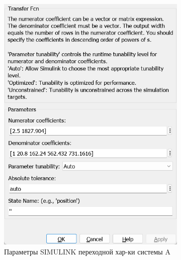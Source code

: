 \documentclass[a4paper, 12pt]{article}
\begin{document}
    \begin{figure}[H]
        \centering
        \begin{subfigure}{0.3\textwidth}
            \centering
            \includegraphics[width=\linewidth]{scheme2_window_A.png}
            \caption{Параметры SIMULINK переходной хар-ки системы A}
            \label{fig:window2_A}
        \end{subfigure}
        \begin{subfigure}{0.3\textwidth}
            \centering

\end{subfigure}
\end{figure}
\end{document}
